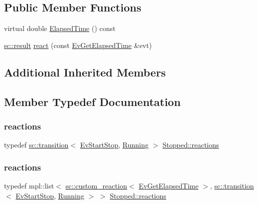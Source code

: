 \subsection*{Public Member Functions}
\begin{DoxyCompactItemize}
\item 
virtual double \mbox{\hyperlink{struct_stopped_ae9dec429ddbf79320898e3bdd67580e8}{Elapsed\+Time}} () const
\item 
\mbox{\hyperlink{namespaceboost_1_1statechart_abe807f6598b614d6d87bb951ecd92331}{sc\+::result}} \mbox{\hyperlink{struct_stopped_a47513114d162de9fc052be34a3b84dc3}{react}} (const \mbox{\hyperlink{struct_ev_get_elapsed_time}{Ev\+Get\+Elapsed\+Time}} \&evt)
\end{DoxyCompactItemize}
\subsection*{Additional Inherited Members}


\subsection{Member Typedef Documentation}
\mbox{\label{struct_stopped_aff133f8a64cf04b86fd197236f8bf3a7}} 
\subsubsection{\texorpdfstring{reactions}{reactions}\hspace{0.1cm}{\footnotesize\ttfamily [1/2]}}
{\footnotesize\ttfamily typedef \mbox{\hyperlink{classboost_1_1statechart_1_1transition}{sc\+::transition}}$<$ \mbox{\hyperlink{struct_ev_start_stop}{Ev\+Start\+Stop}}, \mbox{\hyperlink{struct_running}{Running}} $>$ \mbox{\hyperlink{struct_stopped_aff133f8a64cf04b86fd197236f8bf3a7}{Stopped\+::reactions}}}

\mbox{\label{struct_stopped_ad1c749c4a4613371eaf9b98be5fa34a2}} 
\subsubsection{\texorpdfstring{reactions}{reactions}\hspace{0.1cm}{\footnotesize\ttfamily [2/2]}}
{\footnotesize\ttfamily typedef mpl\+::list$<$ \mbox{\hyperlink{classboost_1_1statechart_1_1custom__reaction}{sc\+::custom\+\_\+reaction}}$<$ \mbox{\hyperlink{struct_ev_get_elapsed_time}{Ev\+Get\+Elapsed\+Time}} $>$, \mbox{\hyperlink{classboost_1_1statechart_1_1transition}{sc\+::transition}}$<$ \mbox{\hyperlink{struct_ev_start_stop}{Ev\+Start\+Stop}}, \mbox{\hyperlink{struct_running}{Running}} $>$ $>$ \mbox{\hyperlink{struct_stopped_aff133f8a64cf04b86fd197236f8bf3a7}{Stopped\+::reactions}}}




